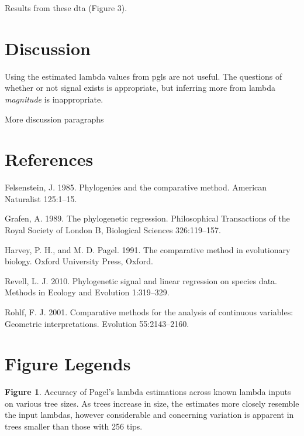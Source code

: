 \documentclass[]{article}
\begin{document}
Results from these dta (Figure 3).

\section{Discussion}\label{discussion}

Using the estimated lambda values from pgls are not useful. The
questions of whether or not signal exists is appropriate, but inferring
more from lambda \emph{magnitude} is inappropriate. \hfill\break

More discussion paragraphs

\newpage

\section{References}\label{references}

\setlength{\parindent}{-0.25in} \setlength{\leftskip}{0.25in}
\setlength{\parskip}{8pt} \noindent

\hypertarget{refs}{}
\hypertarget{ref-Felsenstein1985}{}
Felsenstein, J. 1985. Phylogenies and the comparative method. American
Naturalist 125:1--15.

\hypertarget{ref-Grafen1989}{}
Grafen, A. 1989. The phylogenetic regression. Philosophical Transactions
of the Royal Society of London B, Biological Sciences 326:119--157.

\hypertarget{ref-HarveyPagel1991}{}
Harvey, P. H., and M. D. Pagel. 1991. The comparative method in
evolutionary biology. Oxford University Press, Oxford.

\hypertarget{ref-Revell2010}{}
Revell, L. J. 2010. Phylogenetic signal and linear regression on species
data. Methods in Ecology and Evolution 1:319--329.

\hypertarget{ref-Rohlf2001}{}
Rohlf, F. J. 2001. Comparative methods for the analysis of continuous
variables: Geometric interpretations. Evolution 55:2143--2160.

\newpage

\section{Figure Legends}\label{figure-legends}

\textbf{Figure 1}. Accuracy of Pagel's lambda estimations across known
lambda inputs on various tree sizes. As trees increase in size, the
estimates more closely resemble the input lambdas, however considerable
and concerning variation is apparent in trees smaller than those with
256 tips.
\end{document}

